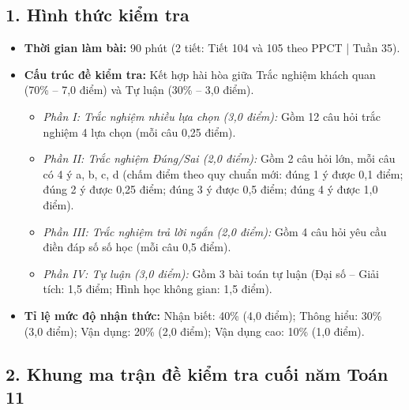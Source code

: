 \documentclass[12pt, a4paper]{article}
\begin{document}
\subsection*{1. Hình thức kiểm tra}
\begin{itemize}[leftmargin=0.6cm]
    \item \textbf{Thời gian làm bài:} 90 phút (2 tiết: Tiết 104 và 105 theo PPCT | Tuần 35).
    \item \textbf{Cấu trúc đề kiểm tra:} Kết hợp hài hòa giữa Trắc nghiệm khách quan (70\% -- 7,0 điểm) và Tự luận (30\% -- 3,0 điểm).
    \begin{itemize}
        \item \textit{Phần I: Trắc nghiệm nhiều lựa chọn (3,0 điểm):} Gồm 12 câu hỏi trắc nghiệm 4 lựa chọn (mỗi câu 0,25 điểm).
        \item \textit{Phần II: Trắc nghiệm Đúng/Sai (2,0 điểm):} Gồm 2 câu hỏi lớn, mỗi câu có 4 ý a, b, c, d (chấm điểm theo quy chuẩn mới: đúng 1 ý được 0,1 điểm; đúng 2 ý được 0,25 điểm; đúng 3 ý được 0,5 điểm; đúng 4 ý được 1,0 điểm).
        \item \textit{Phần III: Trắc nghiệm trả lời ngắn (2,0 điểm):} Gồm 4 câu hỏi yêu cầu điền đáp số số học (mỗi câu 0,5 điểm).
        \item \textit{Phần IV: Tự luận (3,0 điểm):} Gồm 3 bài toán tự luận (Đại số -- Giải tích: 1,5 điểm; Hình học không gian: 1,5 điểm).
    \end{itemize}
    \item \textbf{Tỉ lệ mức độ nhận thức:} Nhận biết: 40\% (4,0 điểm); Thông hiểu: 30\% (3,0 điểm); Vận dụng: 20\% (2,0 điểm); Vận dụng cao: 10\% (1,0 điểm).
\end{itemize}

\subsection*{2. Khung ma trận đề kiểm tra cuối năm Toán 11}
\end{document}
